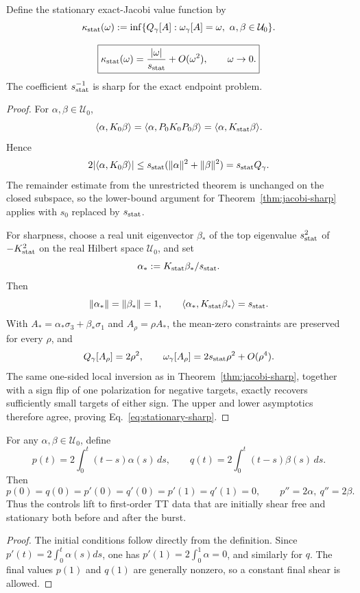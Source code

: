 Define the stationary exact-Jacobi value function by
\begin{equation}
\kappa_{\rm stat}(\omega):=
\inf\{Q_\gamma[A]:\omega_\gamma[A]=\omega,\ \alpha,\beta\in\mathcal U_0\}.
\label{eq:kappa-stat}
\end{equation}

\begin{theorem}
\label{thm:stationary-sharp}
\begin{equation}
\boxed{\kappa_{\rm stat}(\omega)=\frac{|\omega|}{s_{\rm stat}}+O(\omega^2),\qquad \omega\to0.}
\label{eq:stationary-sharp}
\end{equation}
The coefficient $s_{\rm stat}^{-1}$ is sharp for the exact endpoint problem.
\end{theorem}
\begin{proof}
For $\alpha,\beta\in\mathcal U_0$,
\[
\langle\alpha,K_0\beta\rangle
=\langle\alpha,P_0K_0P_0\beta\rangle
=\langle\alpha,K_{\rm stat}\beta\rangle.
\]
Hence
\[
2|\langle\alpha,K_0\beta\rangle|
\le s_{\rm stat}(\|\alpha\|^2+\|\beta\|^2)
=s_{\rm stat}Q_\gamma.
\]
The remainder estimate from the unrestricted theorem is unchanged on the closed subspace, so the lower-bound argument for Theorem~\ref{thm:jacobi-sharp} applies with $s_0$ replaced by $s_{\rm stat}$.

For sharpness, choose a real unit eigenvector $\beta_*$ of the top eigenvalue $s_{\rm stat}^2$ of $-K_{\rm stat}^2$ on the real Hilbert space $\mathcal U_0$, and set
\[
\alpha_*:=K_{\rm stat}\beta_*/s_{\rm stat}.
\]
Then
\[
\|\alpha_*\|=\|\beta_*\|=1,\qquad
\langle\alpha_*,K_{\rm stat}\beta_*\rangle=s_{\rm stat}.
\]
With $A_*=\alpha_*\sigma_3+\beta_*\sigma_1$ and $A_\rho=\rho A_*$, the mean-zero constraints are preserved for every $\rho$, and
\[
Q_\gamma[A_\rho]=2\rho^2,\qquad
\omega_\gamma[A_\rho]=2s_{\rm stat}\rho^2+O(\rho^4).
\]
The same one-sided local inversion as in Theorem~\ref{thm:jacobi-sharp}, together with a sign flip of one polarization for negative targets, exactly recovers sufficiently small targets of either sign. The upper and lower asymptotics therefore agree, proving Eq.~\eqref{eq:stationary-sharp}.
\end{proof}

\begin{lemma}
\label{lem:physical-realization}
For any $\alpha,\beta\in\mathcal U_0$, define
\begin{equation}
p(t)=2\int_0^t(t-s)\alpha(s)\,ds,\qquad
q(t)=2\int_0^t(t-s)\beta(s)\,ds.
\label{eq:pq-from-control}
\end{equation}
Then
\[
p(0)=q(0)=p'(0)=q'(0)=p'(1)=q'(1)=0,
\qquad p''=2\alpha,\ q''=2\beta.
\]
Thus the controls lift to first-order TT data that are initially shear free and stationary both before and after the burst.
\end{lemma}
\begin{proof}
The initial conditions follow directly from the definition. Since $p'(t)=2\int_0^t\alpha(s)ds$, one has $p'(1)=2\int_0^1\alpha=0$, and similarly for $q$. The final values $p(1)$ and $q(1)$ are generally nonzero, so a constant final shear is allowed.
\end{proof}

